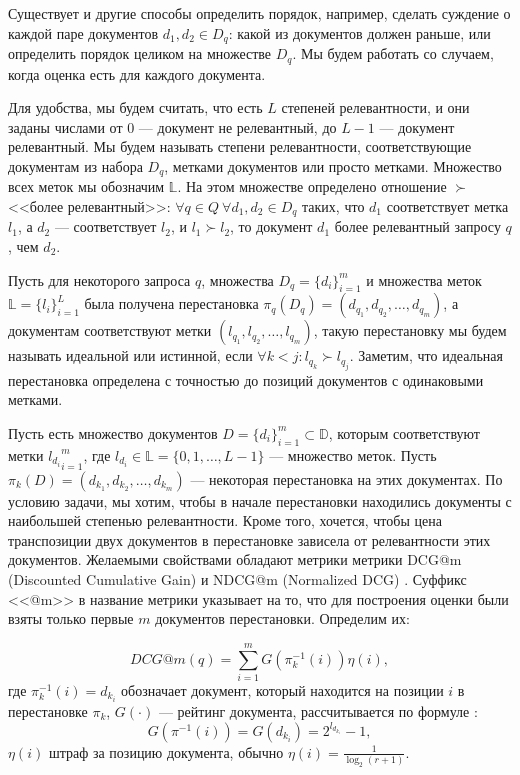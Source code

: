 \documentclass[specialist,
               substylefile = spbu.rtx,
               subf,href,colorlinks=true, 12pt]{disser}
\begin{document}
Существует и другие способы определить порядок, например, сделать суждение о каждой паре документов $d_1, d_2 \in D_q$: какой из документов должен раньше, или определить порядок целиком на множестве $D_q$\cite{IntL2R}. Мы будем работать со случаем, когда оценка есть для каждого документа.\par

Для удобства, мы будем считать, что есть $L$ степеней релевантности, и они заданы числами от $0$ --- документ не релевантный, до $L-1$ --- документ релевантный. Мы будем называть степени релевантности, соответствующие документам из набора $D_q$, метками документов или просто метками. Множество всех меток мы обозначим $\mathbb L$. На этом множестве определено отношение $\succ$ <<более релевантный>>: $\forall q \in Q\ \forall d_1, d_2 \in D_q$ таких, что $d_1$ соответствует метка $l_1$, а $d_2$ --- соответствует $l_2$, и $l_1 \succ l_2$, то документ $d_1$ более релевантный запросу $q$, чем $d_2$.\par

Пусть для некоторого запроса $q$, множества $D_q = \{d_i\}_{i = 1}^{m}$ и множества меток $\mathbb L = \{l_i\}_{i=1}^{L}$ была получена перестановка $\pi_q(D_q) = (d_{q_1}, d_{q_2}, \ldots, d_{q_m})$, а документам соответствуют метки $(l_{q_1}, l_{q_2}, \ldots, l_{q_m})$, такую перестановку мы будем называть идеальной или истинной, если $\forall k < j: l_{q_k} \succ l_{q_j}$. Заметим, что идеальная перестановка определена с точностью до позиций документов с одинаковыми метками.\par

Пусть есть множество документов $D = \{d_i\}_{i=1}^{m} \subset \mathbb D$,  которым соответствуют метки ${l_{d_i}}_{i=1}^{m}$, где $l_{d_i} \in \mathbb L = \{0, 1, \ldots, L-1\}$ --- множество меток. Пусть $\pi_k(D) = (d_{k_1}, d_{k_2}, \ldots, d_{k_m})$ --- некоторая перестановка на этих документах. По условию задачи, мы хотим, чтобы в начале перестановки находились документы с наибольшей степенью релевантности. Кроме того, хочется, чтобы цена транспозиции двух документов в перестановке зависела от релевантности этих документов. Желаемыми свойствами обладают метрики метрики DCG@m (Discounted Cumulative Gain) и NDCG@m (Normalized DCG) \cite{DCGKalervo}. Суффикс <<@m>> в название метрики указывает на то, что для построения оценки были взяты только первые $m$ документов перестановки. Определим их: 

\begin{equation}
\label{eq:dcg}
DCG@m(q)=\sum_{i=1}^{m}{G(\pi_k^{-1}(i))\eta(i)},
\end{equation}
где $\pi_k^{-1}(i) = d_{k_i}$ обозначает документ, который находится на позиции $i$ в перестановке $\pi_k$, $G(\cdot)$ --- рейтинг документа, рассчитывается по формуле \cite{DCGBurges}: 
\begin{equation*}
G(\pi^{-1}(i))=G(d_{k_i}) = 2^{l_{d_{k_i}}} - 1,
\end{equation*}
$\eta(i)$ штраф за позицию документа, обычно $\eta(i)=\frac{1}{\log_2 (r+1)}$.\par
\end{document}
